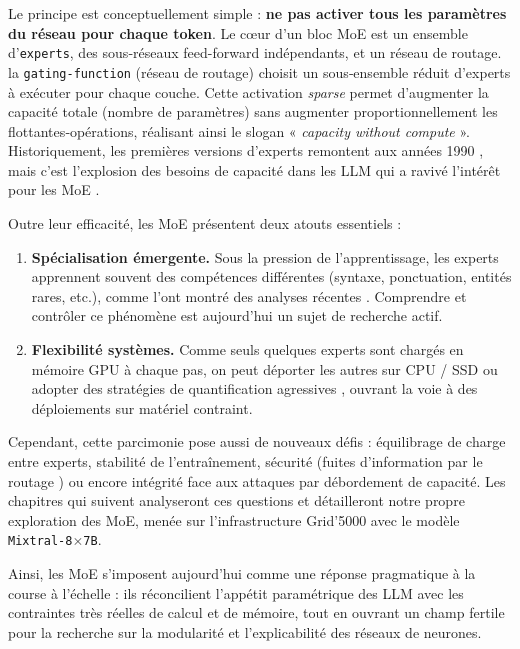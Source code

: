 \documentclass{article}
\begin{document}
\vspace{0.4em}
\noindent
Le principe est conceptuellement simple : \textbf{ne pas activer tous les paramètres du réseau pour chaque token}.  Le cœur d’un bloc MoE est un ensemble d’\texttt{experts}, des sous‐réseaux feed-forward indépendants, et un réseau de routage.
la \texttt{gating-function} (réseau de routage) choisit un sous‐ensemble réduit d’experts à exécuter pour chaque couche.  Cette activation \emph{sparse} permet d’augmenter la capacité totale (nombre de paramètres) sans augmenter proportionnellement les flottantes‐opérations, réalisant ainsi le slogan « \emph{capacity without compute} ».  Historiquement, les premières versions d’experts remontent aux années 1990 \cite{jacobs1991adaptive}, mais c’est l’explosion des besoins de capacité dans les LLM qui a ravivé l’intérêt pour les MoE \cite{fedus2021switch}.  

\vspace{0.4em}
\noindent
Outre leur efficacité, les MoE présentent deux atouts essentiels :

\begin{enumerate}
  \item \textbf{Spécialisation émergente.} Sous la pression de l’apprentissage, les experts apprennent souvent des compétences différentes (syntaxe, ponctuation, entités rares, etc.), comme l’ont montré des analyses récentes \cite{lo2024closer, antoine2025pos}. Comprendre et contrôler ce phénomène est aujourd’hui un sujet de recherche actif.
  \item \textbf{Flexibilité systèmes.} Comme seuls quelques experts sont chargés en mémoire GPU à chaque pas, on peut déporter les autres sur CPU / SSD \cite{he2024expertflow, zhong2024adapmoe} ou adopter des stratégies de quantification agressives \cite{tang2024hobbit}, ouvrant la voie à des déploiements sur matériel contraint.
\end{enumerate}

\vspace{0.4em}
\noindent
Cependant, cette parcimonie pose aussi de nouveaux défis : équilibrage de charge entre experts, stabilité de l’entraînement, sécurité (fuites d’information par le routage \cite{yona2024stealing}) ou encore intégrité face aux attaques par débordement de capacité.  Les chapitres qui suivent analyseront ces questions et détailleront notre propre exploration des MoE, menée sur l’infrastructure Grid’5000 avec le modèle \texttt{Mixtral-8$\times$7B}.

\vspace{0.4em}
\noindent
Ainsi, les MoE s’imposent aujourd’hui comme une réponse pragmatique à la course à l’échelle : ils réconcilient l’appétit paramétrique des LLM avec les contraintes très réelles de calcul et de mémoire, tout en ouvrant un champ fertile pour la recherche sur la modularité et l’explicabilité des réseaux de neurones.
\end{document}
